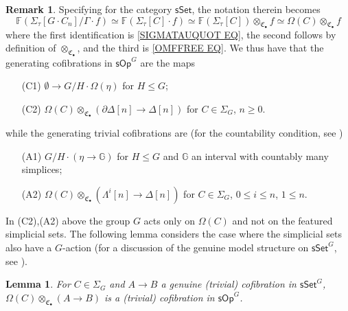\documentclass[a4paper,10pt
,draft
]{article}%
\numberwithin{equation}{section}
\numberwithin{figure}{section}
\newtheorem{lemma}[equation]{Lemma}%
\theoremstyle{definition} %
\newtheorem{remark}[equation]{Remark}%
\newcommand{\sSet}{\ensuremath{\mathsf{sSet}}}%
\newcommand{\sOp}{\ensuremath{\mathsf{sOp}}}%
\newcommand{\1}{\ensuremath{\mathbbm 1}}%
\begin{document}
\begin{remark}\label{GENCOF_SOPG_REM}
	Specifying \cite[Def. \ref{AC-OPGENCOF DEF}]{BP_ACOP}
	for the category $\mathsf{sSet}$,
	the notation therein becomes
\[
	\mathbb{F}
	\left(\Sigma_{\tau}[G \cdot C_{n}]/\Gamma \cdot f\right)
\simeq
	\mathbb{F}
	\left(\Sigma_{\tau}[C] \cdot f\right)
\simeq
	\mathbb{F}
	\left(\Sigma_{\tau}[C] \right) \otimes_{\mathfrak{C}_{\bullet}} f
\simeq 
	\Omega(C) \otimes_{\mathfrak{C}_{\bullet}} f
\]
where the first identification is
\eqref{SIGMATAUQUOT EQ},
the second follows by definition of
$\otimes_{\mathfrak{C}_{\bullet}}$,
and the third is \eqref{OMFFREE EQ}.
We thus have that the generating cofibrations in $\mathsf{sOp}^G$
are the maps
	\begin{itemize}
		\item[(C1)] $\emptyset \to G/H \cdot \Omega(\eta)$ for $H \leq G$;
		\item[(C2)] $\Omega(C) \otimes_{\mathfrak{C}_{\bullet}} (\partial \Delta[n] \to \Delta[n])$
		for $C \in \Sigma_G$, $n \geq 0$.
	\end{itemize}
	while the generating trivial cofibrations are 
	(for the countability condition, 
	see \cite[Rem. \ref{AC-SSETINT_REM}]{BP_ACOP})
	\begin{itemize}
		\item[(A1)] 
		$G/H \cdot \left(\eta \to \mathbb{G}\right)$ 
		for $H \leq G$ and $\mathbb G$ an interval with countably many simplices;
		\item[(A2)] 
		$\Omega(C) \otimes_{\mathfrak{C}_{\bullet}} 
		(\Lambda^i[n] \to \Delta[n])$
		for $C \in \Sigma_G$, $0 \leq i \leq n$, $1 \leq n$.
	\end{itemize}
\end{remark}

In (C2),(A2) above 
the group $G$ acts only on $\Omega(C)$
and not on the featured simplicial sets.
The following lemma considers the case where the simplicial sets also have a $G$-action
(for a discussion of the genuine model structure on 
$\mathsf{sSet}^G$, see \cite[Def. \ref{OC-GENMOD DEF}]{BP_FCOP}).
\begin{lemma}
	\label{OPTENSCOF_LEM}
	For $C \in \Sigma_G$ and $A \to B$ a genuine (trivial) cofibration in $\sSet^G$,
	$\Omega(C) \otimes_{\mathfrak{C}_{\bullet}} (A \to B)$ is a (trivial) cofibration in $\sOp^G$.
\end{lemma}
\end{document}
